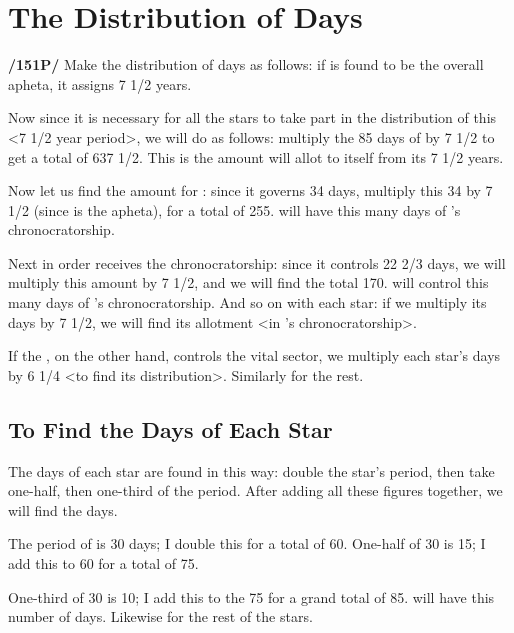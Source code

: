 \section{The Distribution of Days}

\textbf{/151P/} Make the distribution of days as follows: if \Saturn\xspace is found to be the overall apheta, it assigns 7 1/2 years.

Now since it is necessary for all the stars to take part in the distribution of this <7 1/2 year period>, we will do as follows: multiply the 85 days of \Saturn\xspace by 7 1/2 to get a total of 637 1/2. This is the amount \Saturn\xspace will allot to itself from its 7 1/2 years. 

Now let us find the amount for \Jupiter: since it governs 34 days, multiply this 34 by 7 1/2 (since \Saturn\xspace is the apheta), for a total of 255. \Jupiter\xspace will have this many days of \Saturn’s chronocratorship. 

Next in order \Venus\xspace receives the chronocratorship: since
it controls 22 2/3 days, we will multiply this amount by 7 1/2, and we will find the total 170. \Venus\xspace will control this many days of \Saturn’s chronocratorship. And so on with each star: if we multiply its days by 7 1/2, we will find its allotment <in \Saturn’s chronocratorship>. 

If the \Moon, on the other hand, controls the vital sector, we multiply each star’s days by 6 1/4 <to find its distribution>. Similarly for the rest.

\subsection{To Find the Days of Each Star}

The days of each star are found in this way: double the star’s period, then take one-half, then one-third of the period. 
After adding all these figures together, we will find the days. 

The period of \Saturn\xspace is 30 days; I double this for a total of 60. One-half of 30 is 15; I add this to 60 for a total of 75. 

One-third of 30 is 10; I add this to the 75 for a grand total of 85. \Saturn\xspace will have this number of days. Likewise for the rest of the stars.

\newpage